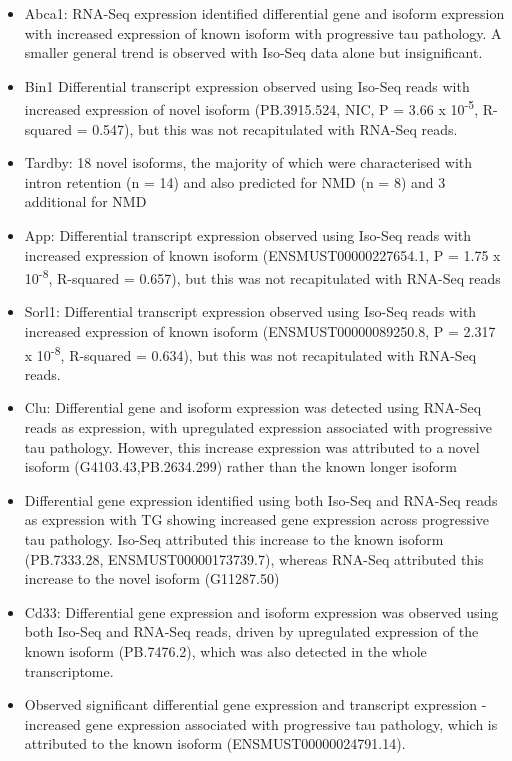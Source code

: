 \begin{itemize}
	\item Abca1: RNA-Seq expression identified differential gene and isoform expression with increased expression of known isoform with progressive tau pathology. A smaller general trend is observed with Iso-Seq data alone but insignificant.
	\item Bin1 Differential transcript expression observed using Iso-Seq reads with increased expression of novel isoform (PB.3915.524, NIC, P = 3.66 x 10\textsuperscript{-5}, R-squared = 0.547), but this was not recapitulated with RNA-Seq reads.
	\item Tardby: 18 novel isoforms, the majority of which were characterised with intron retention (n = 14) and also predicted for NMD (n = 8) and 3 additional for NMD
	\item App: Differential transcript expression observed using Iso-Seq reads with increased expression of known isoform (ENSMUST00000227654.1, P = 1.75 x 10\textsuperscript{-8}, R-squared = 0.657), but this was not recapitulated with RNA-Seq reads
	\item Sorl1: Differential transcript expression observed using Iso-Seq reads with increased expression of known isoform (ENSMUST00000089250.8, P = 2.317 x 10\textsuperscript{-8}, R-squared = 0.634), but this was not recapitulated with RNA-Seq reads.
	\item Clu: Differential gene and isoform expression was detected using RNA-Seq reads as expression, with upregulated expression associated with progressive tau pathology. However, this increase expression was attributed to a novel isoform (G4103.43,PB.2634.299) rather than the known longer isoform
	\item Differential gene expression identified using both Iso-Seq and RNA-Seq reads as expression with TG showing increased gene expression across progressive tau pathology. Iso-Seq attributed this increase to the known isoform (PB.7333.28, ENSMUST00000173739.7), whereas RNA-Seq attributed this increase to the novel isoform (G11287.50)
	\item Cd33: Differential gene expression and isoform expression was observed using both Iso-Seq and RNA-Seq reads, driven by upregulated expression of the known isoform (PB.7476.2), which was also detected in the whole transcriptome. 
	\item Observed significant differential gene expression and transcript expression - increased gene expression associated with progressive tau pathology, which is attributed to the known isoform (ENSMUST00000024791.14).
\end{itemize}


